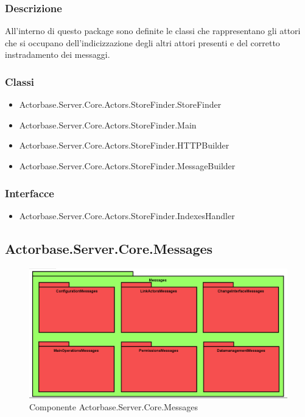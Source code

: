\documentclass[a4paper]{article}
\begin{document}
			\subsubsection{Descrizione}
				All'interno di questo package sono definite le classi che rappresentano gli attori che si occupano dell'indicizzazione degli altri attori presenti e del corretto instradamento dei messaggi.
			\subsubsection{Classi}
			\begin{itemize}
				\item Actorbase.Server.Core.Actors.StoreFinder.StoreFinder
				\item Actorbase.Server.Core.Actors.StoreFinder.Main
				\item Actorbase.Server.Core.Actors.StoreFinder.HTTPBuilder
				\item Actorbase.Server.Core.Actors.StoreFinder.MessageBuilder
			\end{itemize}
			\subsubsection{Interfacce}
			\begin{itemize}
				\item Actorbase.Server.Core.Actors.StoreFinder.IndexesHandler
			\end{itemize}
		
		\subsection{Actorbase.Server.Core.Messages}
			\begin{figure} [H]
			\centering
			\includegraphics[scale=0.55]{Server/Package/MessagesLevel.png}
			\caption{Componente Actorbase.Server.Core.Messages}
			\end{figure}
\end{document}
